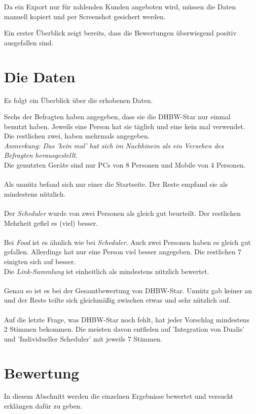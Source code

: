 Da ein Export nur für zahlenden Kunden angeboten wird, müssen die Daten manuell kopiert und per Screenshot gesichert werden.

Ein erster Überblick zeigt bereits, dass die Bewertungen überwiegend positiv ausgefallen sind.

\section{Die Daten }
Es folgt ein Überblick über die erhobenen Daten.

Sechs der Befragten haben angegeben, dass sie die DHBW-Star nur einmal benutzt haben.
Jeweils eine Person hat sie täglich und eine kein mal verwendet.
Die restlichen zwei, haben mehrmals angegeben. \\
\emph{Anmerkung: Das 'kein mal' hat sich im Nachhinein als ein Versehen des Befragten herausgestellt. }
\\
Die genutzten Geräte sind nur PCs von 8 Personen und Mobile von 4 Personen. \\
\\
Als unnütz befand sich nur einer die Startseite. Der Reste empfand sie als mindestens nützlich. \\
\\
Der \emph{Scheduler} wurde von zwei Personen als gleich gut beurteilt. Der restlichen Mehrheit gefiel es (viel) besser. \\
\\
Bei \emph{Food} ist es ähnlich wie bei \emph{Scheduler}. Auch zwei Personen haben es gleich gut gefallen. Allerdings hat nur eine Person viel besser angegeben. Die restlichen 7 einigten sich auf besser.
\\
Die \emph{Link-Sammlung} ist einheitlich als mindestens nützlich bewertet. \\
\\
Genau so ist es bei der Gesamtbewertung von DHBW-Star. Unnütz gab keiner an und der Reste teilte sich gleichmäßig zwischen etwas und sehr nützlich auf. \\
\\
Auf die letzte Frage, was DHBW-Star noch fehlt, hat jeder Vorschlag mindestens 2 Stimmen bekommen. Die meisten davon entfielen auf 'Integration von Dualis' und 'Individueller Scheduler' mit jeweils 7 Stimmen.

\section{Bewertung}
In diesem Abschnitt werden die einzelnen Ergebnisse bewertet und versucht erklängen dafür zu geben.

